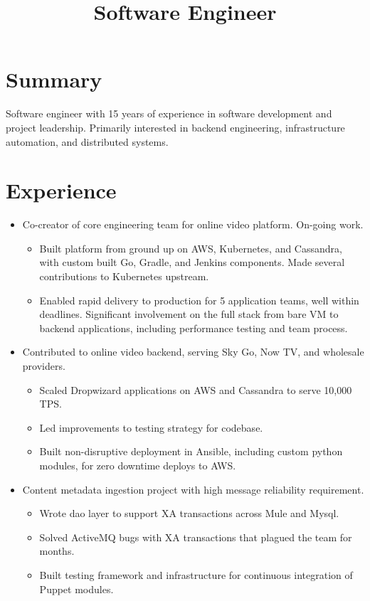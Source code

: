 \documentclass[11pt,a4paper,roman]{moderncv}
\title{Software Engineer}
\begin{document}
\makecvtitle{}

\section{Summary}
Software engineer with 15 years of experience in software development and project leadership.\newline{}
Primarily interested in backend engineering, infrastructure automation, and distributed systems.

\section{Experience}

\begin{itemize}
\item Co-creator of core engineering team for online video platform. On-going work.
  \begin{itemize}
  \item Built platform from ground up on AWS, Kubernetes, and Cassandra, with custom built Go, Gradle, and Jenkins components. Made several contributions to Kubernetes upstream.
  \item Enabled rapid delivery to production for 5 application teams, well within deadlines. Significant involvement on the full stack from bare VM to backend applications, including performance testing and team process.
  \end{itemize}
\item Contributed to online video backend, serving Sky Go, Now TV, and wholesale providers.
  \begin{itemize}
  \item Scaled Dropwizard applications on AWS and Cassandra to serve 10,000 TPS.\@
  \item Led improvements to testing strategy for codebase.
  \item Built non-disruptive deployment in Ansible, including custom python modules, for zero downtime deploys to AWS.\@
  \end{itemize}
\item Content metadata ingestion project with high message reliability requirement.
  \begin{itemize}
  \item Wrote dao layer to support XA transactions across Mule and Mysql.
  \item Solved ActiveMQ bugs with XA transactions that plagued the team for months.
  \item Built testing framework and infrastructure for continuous integration of Puppet modules.
  \end{itemize}
\end{itemize}
\end{document}
